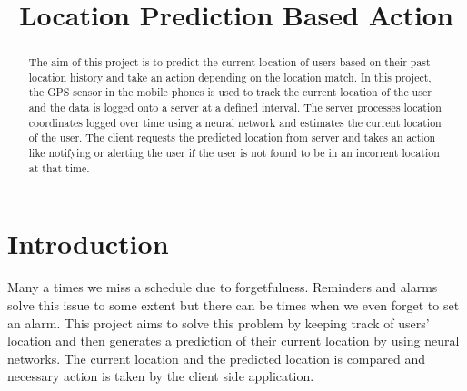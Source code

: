 \documentclass[conference]{IEEEtran}
\begin{document}
%
\title{Location Prediction Based Action}


\author{
}

\maketitle


\begin{abstract}
The aim of this project is to  predict the current location of users based on their past location history and take an action depending on the location match. In this project, the GPS sensor in the mobile phones is used to track the current location of the user and the data is logged onto a server at a defined interval. The server processes location coordinates logged over time using a neural network and estimates the current location of the user. The client requests the predicted location from server and takes an action like notifying or alerting the user if the user is not found to be in an incorrent location at that time.
\end{abstract}

\IEEEpeerreviewmaketitle



\section{Introduction}
Many a times we miss a schedule due to forgetfulness. Reminders and alarms solve this issue to some extent but there can be times when we even forget to set an alarm. This project aims to solve this problem by keeping track of users' location and then generates a prediction of their current location by using neural networks. The current location and the predicted location is compared and necessary action is taken by the client side application.
\end{document}
